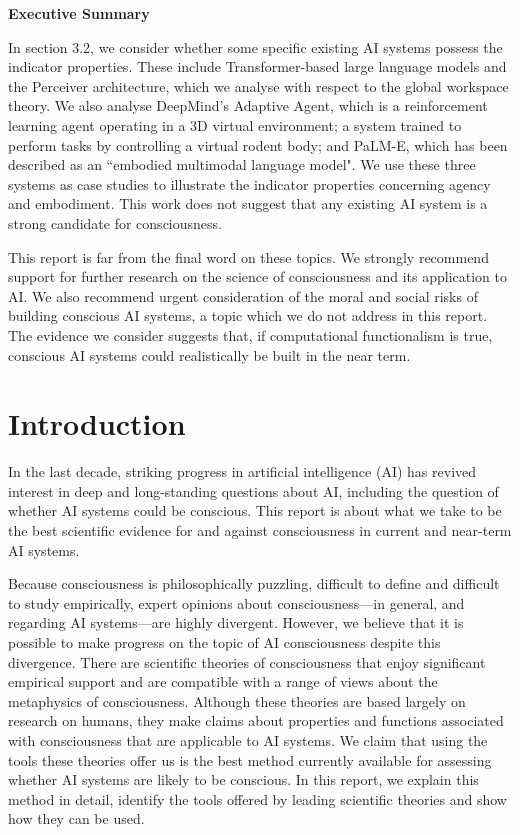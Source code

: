 \documentclass[12pt]{article}
\newenvironment{executivesummarypage}
  {
   \noindent\LARGE \textbf{Executive Summary} \normalsize
   \vspace{1em}
   \par\noindent
  }
  {\newpage}
\begin{document}
\begin{executivesummarypage}
In section 3.2, we consider whether some specific existing AI systems possess the indicator properties. These include Transformer-based large language models and the Perceiver architecture, which we analyse with respect to the global workspace theory. We also analyse DeepMind’s Adaptive Agent, which is a reinforcement learning agent operating in a 3D virtual environment; a system trained to perform tasks by controlling a virtual rodent body; and PaLM-E, which has been described as an ``embodied multimodal language model". We use these three systems as case studies to illustrate the indicator properties concerning agency and embodiment. This work does not suggest that any existing AI system is a strong candidate for consciousness.

This report is far from the final word on these topics. We strongly recommend support for further research on the science of consciousness and its application to AI. We also recommend urgent consideration of the moral and social risks of building conscious AI systems, a topic which we do not address in this report. The evidence we consider suggests that, if computational functionalism is true, conscious AI systems could realistically be built in the near term.

\end{executivesummarypage}

\newpage

\tableofcontents
\newpage

\section{Introduction}

In the last decade, striking progress in artificial intelligence (AI) has revived interest in deep and long-standing questions about AI, including the question of whether AI systems could be conscious. This report is about what we take to be the best scientific evidence for and against consciousness in current and near-term AI systems.

Because consciousness is philosophically puzzling, difficult to define and difficult to study empirically, expert opinions about consciousness—in general, and regarding AI systems—are highly divergent. However, we believe that it is possible to make progress on the topic of AI consciousness despite this divergence. There are scientific theories of consciousness that enjoy significant empirical support and are compatible with a range of views about the metaphysics of consciousness. Although these theories are based largely on research on humans, they make claims about properties and functions associated with consciousness that are applicable to AI systems. We claim that using the tools these theories offer us is the best method currently available for assessing whether AI systems are likely to be conscious. In this report, we explain this method in detail, identify the tools offered by leading scientific theories and show how they can be used.
\end{document}
